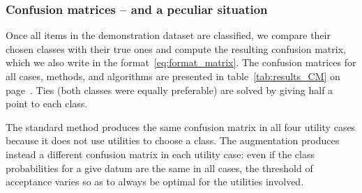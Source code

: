 \documentclass[a4paper,12pt,%
onecolumn,oneside,article,%
british%
]{memoir}
\renewcommand*{\|}[1][]{\nonscript\:#1\vert\nonscript\:\mathopen{}}
\begin{document}
\subsubsection{Confusion matrices -- and a peculiar situation}

Once all items in the demonstration dataset are classified, we compare their chosen classes with their true ones and compute the resulting confusion matrix, which we also write in the format~\eqref{eq:format_matrix}. The confusion matrices for all cases, methods, and algorithms are presented in table~\ref{tab:results_CM} on page~\pageref{tab:results_CM}. Ties (both classes were equally preferable) are solved by giving half a point to each class.

The standard method produces the same confusion matrix in all four utility cases because it does not use utilities to choose a class. The augmentation produces instead a different confusion matrix in each utility case: even if the class probabilities for a give datum are the same in all cases, the threshold of acceptance varies so as to always be optimal for the utilities involved.
\end{document}
